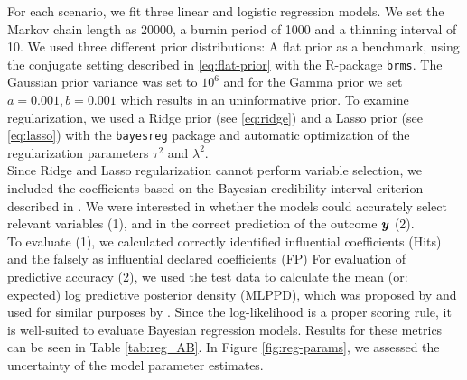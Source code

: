 For each scenario, we fit three linear and logistic regression models.
We set the Markov chain length as 20000, a burnin period of 1000 and a thinning interval of 10. We used three different prior distributions: A flat prior as a benchmark, using the conjugate setting described in \eqref{eq:flat-prior} with the R-package \texttt{brms}.
The Gaussian prior variance was set to $10^6$ and for the Gamma prior we set $a = 0.001, b=0.001$ which results in an uninformative prior. To examine regularization, we used a Ridge prior (see \eqref{eq:ridge}) and a Lasso prior (see \eqref{eq:lasso})  with the \texttt{bayesreg} package and automatic optimization of the regularization parameters $\tau^2$ and $\lambda^2$.\\

Since Ridge and Lasso regularization cannot perform variable selection, we included the coefficients based on the Bayesian credibility interval criterion described in \citet{van_erp_shrinkage_2019}.
We were interested in whether the models could accurately select relevant variables (1), and in the correct prediction of the outcome $\bm{y}$ (2).\\

To evaluate (1), we calculated correctly identified influential coefficients (Hits) and the falsely as influential declared coefficients (FP)
For evaluation of predictive accuracy (2), we used the test data to calculate the mean (or: expected) log predictive posterior density (MLPPD), which was proposed by \citet{gelman_understanding_2013} and used for similar purposes by \citet{van_erp_shrinkage_2019}. Since the log-likelihood is a proper scoring rule, it is well-suited to evaluate Bayesian regression models.
Results for these metrics can be seen in Table \ref{tab:reg_AB}.
In Figure \ref{fig:reg-params}, we assessed the uncertainty of the model parameter estimates.


